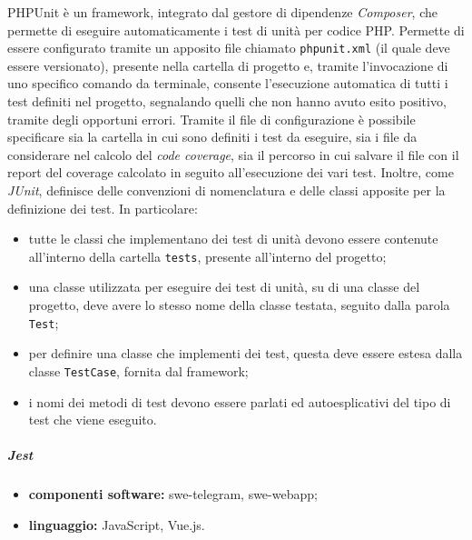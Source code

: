 				PHPUnit è un framework, integrato dal gestore di dipendenze \textit{Composer}, che permette di eseguire automaticamente i test di unità per codice PHP.
				\newline
				Permette di essere configurato tramite un apposito file chiamato \verb!phpunit.xml! (il quale deve essere versionato), presente nella cartella di progetto e, tramite l'invocazione di uno specifico comando da terminale, consente l'esecuzione automatica di tutti i test definiti nel progetto, segnalando quelli che non hanno avuto esito positivo, tramite degli opportuni errori.
				\newline
				Tramite il file di configurazione è possibile specificare sia la cartella in cui sono definiti i test da eseguire, sia i file da considerare nel calcolo del \textit{code coverage}, sia il percorso in cui salvare il file con il report del coverage calcolato in seguito all'esecuzione dei vari test.
				\newline
				Inoltre, come \textit{JUnit}, definisce delle convenzioni di nomenclatura e delle classi apposite per la definizione dei test. In particolare:
				\begin{itemize}
					\item tutte le classi che implementano dei test di unità devono essere contenute all'interno della cartella \verb!tests!, presente all'interno del progetto;
					\item una classe utilizzata per eseguire dei test di unità, su di una classe del progetto, deve avere lo stesso nome della classe testata, seguito dalla parola \verb!Test!;
					\item per definire una classe che implementi dei test, questa deve essere estesa dalla classe \verb!TestCase!, fornita dal framework;
					\item i nomi dei metodi di test devono essere parlati ed autoesplicativi del tipo di test che viene eseguito.
				\end{itemize}
		
			\subparagraph{Jest}
			
				\begin{itemize}
					\item \textbf{componenti software:} swe-telegram, swe-webapp;
					\item \textbf{linguaggio:} JavaScript, Vue.js.
				\end{itemize}
				
